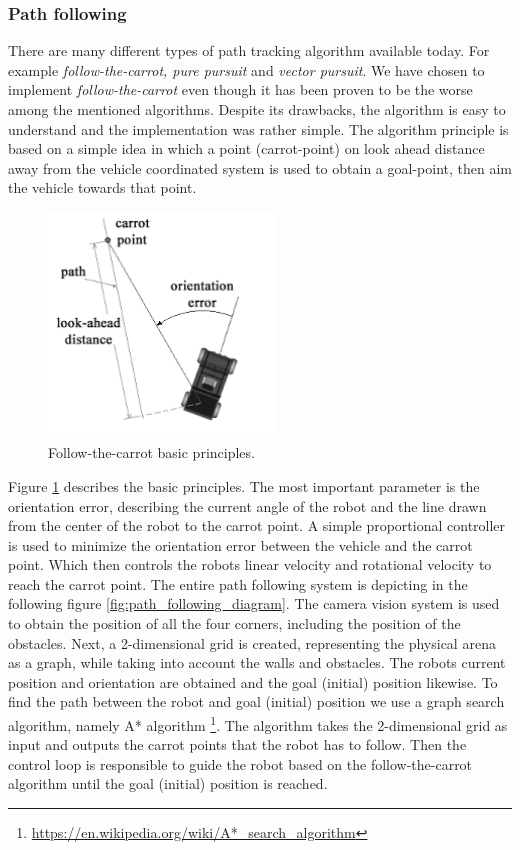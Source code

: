 \subsubsection{Path following}

There are many different types of path tracking algorithm available today. For example \emph{follow-the-carrot, pure pursuit} and \emph{vector pursuit}. We have chosen to implement \emph{follow-the-carrot} even though it has been proven \citep{lundgren2003path} to be the worse among the mentioned algorithms. Despite its drawbacks, the algorithm is easy to understand and the implementation was rather simple. The algorithm principle is based on a simple idea in which a point (carrot-point) on look ahead distance away from the vehicle coordinated system is used to obtain a goal-point, then aim the vehicle towards that point.

\begin{figure}[H]
  \centering	
  \includegraphics[width=6cm]{include/images/follow_the_carrot.PNG}
  \caption{Follow-the-carrot basic principles.}
  \label{fig:follow_the_carrot}
\end{figure}

Figure \ref{fig:follow_the_carrot} describes the basic principles. The most important parameter is the orientation error, describing the current angle of the robot and the line drawn from the center of the robot to the carrot point. A simple proportional controller is used to minimize the orientation error between the vehicle and the carrot point. Which then controls the robots linear velocity and rotational velocity to reach the carrot point. The entire path following system is depicting in the following figure \ref{fig:path_following_diagram}. The camera vision system is used to obtain the position of all the four corners, including the position of the obstacles. Next, a 2-dimensional grid is created, representing the physical arena as a graph, while taking into account the walls and obstacles. The robots current position and orientation are obtained and the goal (initial) position likewise. To find the path between the robot and goal (initial) position we use a graph search algorithm, namely A* algorithm \footnote{\url{https://en.wikipedia.org/wiki/A*_search_algorithm}}. The algorithm takes the 2-dimensional grid as input and outputs the carrot points that the robot has to follow. Then the control loop is responsible to guide the robot based on the follow-the-carrot algorithm until the goal (initial) position is reached.

